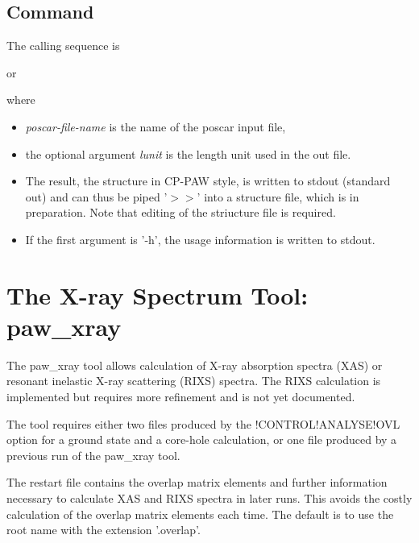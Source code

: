 \documentclass[final,12pt,makeidx,DIV=calc]{article}
\begin{document}
{{{{{{%
\subsection{Command}

The calling sequence is\bigskip

\bigskip

\noindent or\bigskip

\bigskip

\noindent
where 
\begin{itemize}
\item \textit{poscar-file-name} is the name of the poscar input file, 
\item the optional argument \textit{lunit} is the length unit used in
  the out file.
\item The result, the structure in CP-PAW style, is written to stdout
  (standard out) and can thus be piped '$>>$' into a structure file,
  which is in preparation. Note that editing of the striucture file is
  required.
\item If the first argument is '-h', the usage information is written
  to stdout.
\end{itemize}

\newpage
\section{The X-ray Spectrum Tool: paw\_xray}
The paw\_xray tool allows calculation of X-ray absorption spectra (XAS) or
resonant inelastic X-ray scattering (RIXS) spectra. The RIXS calculation
is implemented but requires more refinement and is not yet documented. 

The tool requires either two files 
produced by the !CONTROL!ANALYSE!OVL option for a ground state and a
core-hole calculation, or one file produced by a previous run of the
paw\_xray tool.

The restart file contains the overlap matrix elements and further information
necessary to calculate XAS and RIXS spectra in later runs. This avoids the costly
calculation of the overlap matrix elements each time. The default is to use
the root name with the extension '.overlap'.

}}}}}}
\end{document}

